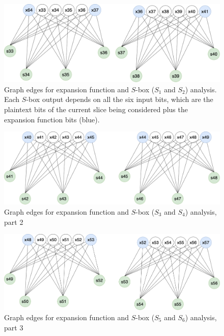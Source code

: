 \documentclass{report}
\begin{document}
\begin{figure}[h!]
    \centering
    \includegraphics[scale=0.3]{Grafo_DES-Expansion1.png}
    \caption{Graph edges for expansion function and $S$-box ($S_1$ and $S_2$) analysis. Each $S$-box output depends on all the six input bits, which are the plaintext bits of the current slice being considered plus the expansion function bits (blue).}
    \label{fig:expansion1}
\end{figure}

\begin{figure}[h!]
    \centering
    \includegraphics[scale=0.3]{Grafo_DES-expansion2.png}
    \caption{Graph edges for expansion function and $S$-box ($S_3$ and $S_4$) analysis, part 2}
    \label{fig:expansion2}
\end{figure}

\begin{figure}[h!]
    \centering
    \includegraphics[scale=0.3]{Grafo_DES-expansion3.png}
    \caption{Graph edges for expansion function and $S$-box ($S_5$ and $S_6$) analysis, part 3}
    \label{fig:expansion3}
\end{figure}
\end{document}

